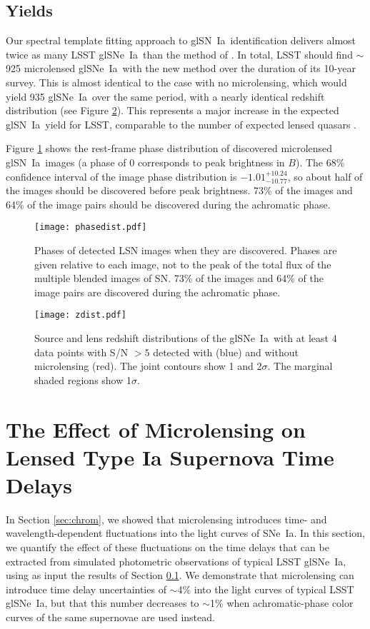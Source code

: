 \documentclass[iop,apj,numberedappendix,twocolappendix]{emulateapj}
\newcommand{\snia}{{\rm SN~Ia}}
\newcommand{\sneia}{{\rm SNe~Ia}}
\begin{document}
\subsection{Yields}
\label{sec:yields}
Our spectral template fitting approach to gl\snia\ identification delivers almost twice as many LSST gl\sneia\ than the method of \cite{gn17}.
In total, LSST should find $\sim$925 microlensed gl\sneia\ with the new method over the duration of its 10-year survey. 
This is almost identical to the case with no microlensing, which would yield 935 gl\sneia\ over the same period, with a nearly identical redshift distribution (see Figure \ref{fig:zdist}). 
This represents a major increase in the expected gl\snia\ yield for LSST, comparable to the number of expected lensed quasars \citep{om10}.

Figure \ref{fig:phase} shows the rest-frame phase distribution of discovered microlensed gl\snia\ images (a phase of 0 corresponds to peak brightness in $B$). 
The 68\% confidence interval of the image phase distribution is $-1.01^{+10.24}_{-10.77}$, so about half of the images should be discovered before peak brightness. 
73\% of the images and 64\% of the image pairs should be discovered during the achromatic phase.


\begin{figure}
	\centering
	\texttt{[image: phasedist.pdf]}
    \caption{Phases of detected LSN images when they are discovered.
    Phases are given relative to each image, not to the peak of the total flux of the multiple blended images of SN.
    73\% of the images and 64\% of the image pairs are discovered during the achromatic phase.}
    \label{fig:phase}
\end{figure}

\begin{figure}
	\centering
    \texttt{[image: zdist.pdf]}
    \caption{Source and lens redshift distributions of the gl\sneia\ with at least 4 data points with S/N $> 5$ detected with (blue) and without microlensing (red).
    The joint contours show 1 and 2$\sigma$.
    The marginal shaded regions show 1$\sigma$.}
    \label{fig:zdist}
\end{figure}


\section{The Effect of Microlensing on Lensed Type Ia Supernova Time Delays}
\label{sec:dtmeth}
In Section \ref{sec:chrom}, we showed that microlensing introduces time- and wavelength-dependent fluctuations into the light curves of \sneia. 
In this section, we quantify the effect of these fluctuations on the time delays that can be extracted from simulated photometric observations of typical LSST gl\sneia, using as input the results of Section \ref{sec:yields}.
We demonstrate that microlensing can introduce time delay uncertainties of $\sim$4\% into the light curves of typical LSST gl\sneia, but that this number decreases to $\sim$1\% when achromatic-phase color curves of the same supernovae are used instead.
\end{document}
